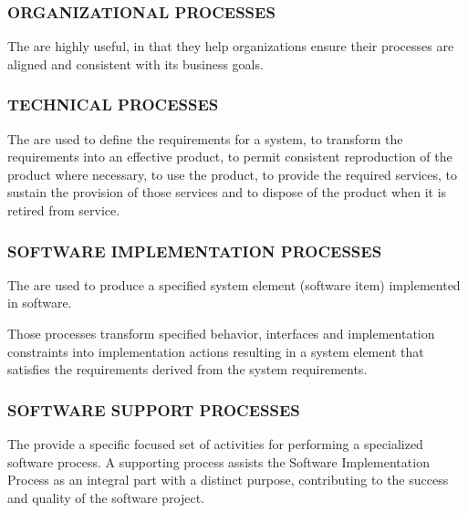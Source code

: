 		\subsubsection{ORGANIZATIONAL PROCESSES}
		\begin{adjustwidth}{1em}{0pt}

			The  are highly useful, in that they help organizations ensure their processes are aligned and consistent with its business goals.

		\end{adjustwidth}

		\subsubsection{TECHNICAL PROCESSES}
		\begin{adjustwidth}{1em}{0pt}

			The  are used to define the requirements for a system, to transform the requirements into an effective product, to permit consistent reproduction of the product where necessary, to use the product, to provide the required services, to sustain the provision of those services and to dispose of the product when it is retired from service.

		\end{adjustwidth}

		\subsubsection{SOFTWARE IMPLEMENTATION PROCESSES}
		\begin{adjustwidth}{1em}{0pt}

			The  are used to produce a specified system element (software item) implemented in software. 

			Those processes transform specified behavior, interfaces and implementation constraints into implementation actions resulting in a system element that satisfies the requirements derived from the system requirements.

		\end{adjustwidth}

		\subsubsection{SOFTWARE SUPPORT PROCESSES}
		\begin{adjustwidth}{1em}{0pt}

			The  provide a specific focused set of activities for performing a specialized software process. A supporting process assists the Software Implementation Process as an integral part with a distinct purpose, contributing to the success and quality of the software project.

		\end{adjustwidth}

